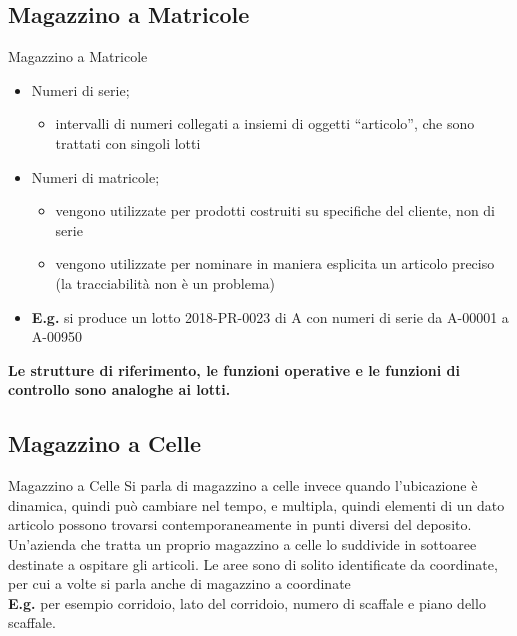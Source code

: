 \documentclass{beamer}
\begin{document}
\subsection{Magazzino a Matricole}
\begin{frame}{Magazzino a Matricole}
    \begin{itemize}
        \item Numeri di serie;
        \begin{itemize}
            \item intervalli di numeri collegati a insiemi di oggetti “articolo”, che sono trattati con singoli lotti
        \end{itemize}
        \item Numeri di matricole;
        \begin{itemize}
            \item vengono utilizzate per prodotti costruiti su specifiche del cliente, non di serie
            \item vengono utilizzate per nominare in maniera esplicita un articolo preciso (la tracciabilità non è un problema)
        \end{itemize}
        \item \textbf{E.g.} si produce un lotto 2018-PR-0023 di A con numeri di serie da A-00001 a A-00950
    \end{itemize}
    \vspace{1.5em}
    \textbf{Le strutture di riferimento, le funzioni operative e le funzioni di controllo sono analoghe ai lotti.}
\end{frame}

\subsection{Magazzino a Celle}
\begin{frame}{Magazzino a Celle}
    Si parla di magazzino a celle invece quando l'ubicazione è dinamica, quindi può cambiare nel tempo, e multipla, quindi elementi di un dato articolo possono trovarsi contemporaneamente in punti diversi del deposito.\\
    \vspace{1.5em}
    Un'azienda che tratta un proprio magazzino a celle lo suddivide in sottoaree destinate a ospitare gli articoli. Le aree sono di solito identificate da coordinate, per cui a volte si parla anche di magazzino a coordinate\\
    \vspace{1.5em}
    \textbf{E.g.} per esempio corridoio, lato del corridoio, numero di scaffale e piano dello scaffale.
\end{frame}
\end{document}
